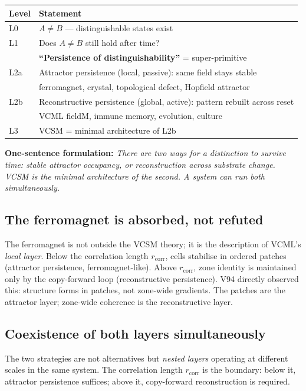 \documentclass[11pt]{article}
\begin{document}
\begin{center}
\begin{tabular}{ll}
\toprule
Level & Statement \\
\midrule
L0 & $A \neq B$ --- distinguishable states exist \\
L1 & Does $A \neq B$ still hold after time? \\
   & \textbf{``Persistence of distinguishability''} = super-primitive \\
L2a & Attractor persistence (local, passive): same field stays stable \\
    & ferromagnet, crystal, topological defect, Hopfield attractor \\
L2b & Reconstructive persistence (global, active): pattern rebuilt across reset \\
    & VCML fieldM, immune memory, evolution, culture \\
L3  & VCSM = minimal architecture of L2b \\
\bottomrule
\end{tabular}
\end{center}

\textbf{One-sentence formulation:}
\emph{There are two ways for a distinction to survive time:
stable attractor occupancy, or reconstruction across substrate change.
VCSM is the minimal architecture of the second.
A system can run both simultaneously.}

\subsection{The ferromagnet is absorbed, not refuted}

The ferromagnet is not outside the VCSM theory; it is the description of
VCML's \emph{local layer}.
Below the correlation length $r_\mathrm{corr}$, cells stabilise in
ordered patches (attractor persistence, ferromagnet-like).
Above $r_\mathrm{corr}$, zone identity is maintained only by the
copy-forward loop (reconstructive persistence).
V94 directly observed this: structure forms in patches, not zone-wide
gradients.
The patches are the attractor layer; zone-wide coherence is the
reconstructive layer.

\subsection{Coexistence of both layers simultaneously}

The two strategies are not alternatives but \emph{nested layers} operating
at different scales in the same system.
The correlation length $r_\mathrm{corr}$ is the boundary:
below it, attractor persistence suffices; above it, copy-forward reconstruction
is required.
\end{document}
